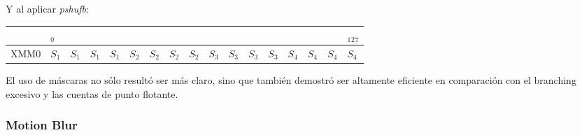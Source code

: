 \documentclass[a4paper]{article}
\begin{document}
\begin{itemize}
\begin{itemize}
\begin{table}[h]
\center
Y al aplicar \textit{pshufb}:
\begin{tabular}{lllllllllllllllll}
                           & $_0$                       &                        &                        &                        &                            &                        &                        &                        &                            &                        &                        &                        &                            &                        &                        & $_1$$_2$$_7$                    \\ \hline
\multicolumn{1}{|l|}{XMM0} & \multicolumn{1}{l|}{$S_1$} & \multicolumn{1}{l|}{$S_1$} & \multicolumn{1}{l|}{$S_1$} & \multicolumn{1}{l|}{$S_1$} & \multicolumn{1}{l|}{$S_2$} & \multicolumn{1}{l|}{$S_2$} & \multicolumn{1}{l|}{$S_2$} & \multicolumn{1}{l|}{$S_2$} & \multicolumn{1}{l|}{$S_3$} & \multicolumn{1}{l|}{$S_3$} & \multicolumn{1}{l|}{$S_3$} & \multicolumn{1}{l|}{$S_3$} & \multicolumn{1}{l|}{$S_4$} & \multicolumn{1}{l|}{$S_4$} & \multicolumn{1}{l|}{$S_4$} & \multicolumn{1}{l|}{$S_4$} \\ \hline
\end{tabular}
\end{table}

El uso de m\'{a}scaras no s\'{o}lo result\'{o} ser m\'{a}s claro, sino que tambi\'{e}n demostr\'{o} ser altamente eficiente en comparaci\'{o}n con el branching excesivo y las cuentas de punto flotante.
\end{itemize}
\end{itemize}

\subsubsection{Motion Blur}
\end{document}

